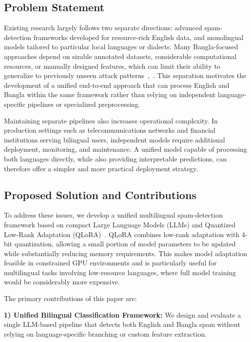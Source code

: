 \documentclass[journal]{IEEEtran}
\begin{document}
\subsection{Problem Statement}

Existing research largely follows two separate directions: advanced spam-detection frameworks developed for resource-rich English data, and monolingual models tailored to particular local languages or dialects. Many Bangla-focused approaches depend on sizable annotated datasets, considerable computational resources, or manually designed features, which can limit their ability to generalize to previously unseen attack patterns~\cite{ref7},~\cite{ref10}. This separation motivates the development of a unified end-to-end approach that can process English and Bangla within the same framework rather than relying on independent language-specific pipelines or specialized preprocessing.

Maintaining separate pipelines also increases operational complexity. In production settings such as telecommunications networks and financial institutions serving bilingual users, independent models require additional deployment, monitoring, and maintenance. A unified model capable of processing both languages directly, while also providing interpretable predictions, can therefore offer a simpler and more practical deployment strategy.

\subsection{Proposed Solution and Contributions}

To address these issues, we develop a unified multilingual spam-detection framework based on compact Large Language Models (LLMs) and Quantized Low-Rank Adaptation (QLoRA)~\cite{ref11}. QLoRA combines low-rank adaptation with 4-bit quantization, allowing a small portion of model parameters to be updated while substantially reducing memory requirements. This makes model adaptation feasible in constrained GPU environments and is particularly useful for multilingual tasks involving low-resource languages, where full model training would be considerably more expensive.

The primary contributions of this paper are:

\textbf{1) Unified Bilingual Classification Framework:} We design and evaluate a single LLM-based pipeline that detects both English and Bangla spam without relying on language-specific branching or custom feature extraction.
\end{document}
